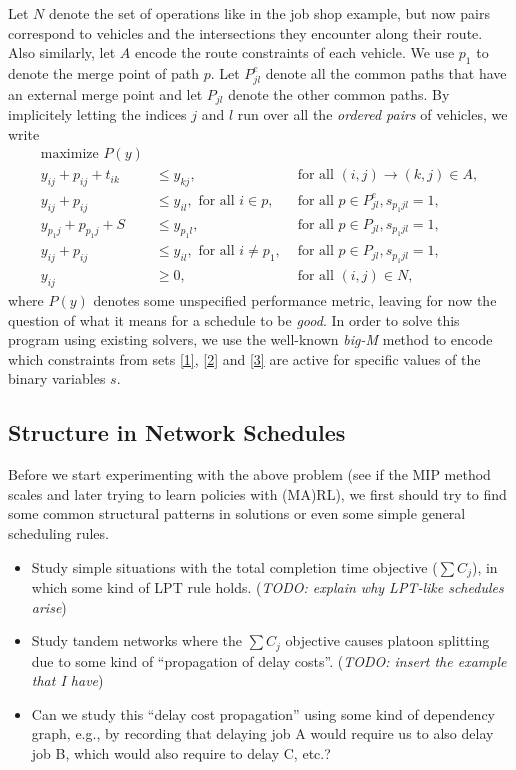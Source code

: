 \documentclass{article}
\theoremstyle{definition}
\begin{document}
Let $N$ denote the set of operations like in the job shop example, but now pairs
correspond to vehicles and the intersections they encounter along their route.
Also similarly, let $A$ encode the route constraints of each vehicle. We use
$p_{1}$ to denote the merge point of path $p$. Let $P_{jl}^{e}$ denote all the
common paths that have an external merge point and let $P_{jl}$ denote the other
common paths. By implicitely letting the indices $j$ and $l$ run over all the
\textit{ordered pairs} of vehicles, we write
%
\begin{subequations}
\begin{align}
  \text{maximize } P(y) \\
  y_{ij} + p_{ij} + t_{ik} &\leq y_{kj}, & \text{ for all } (i,j) \xrightarrow{} (k,j) \in A, \\
  \label{1} y_{ij} + p_{ij} &\leq y_{il}, \text{ for all } i \in p, &\text{ for all } p \in P_{jl}^{e}, s_{p_{1}jl} = 1, \\
  \label{2} y_{p_{1}j} + p_{p_{1}j} + S &\leq y_{p_{1}l},  &\text{ for all } p \in P_{jl}, s_{p_{1}jl} = 1, \\
  \label{3} y_{ij} + p_{ij} &\leq y_{il}, \text{ for all } i \neq p_{1}, &\text{ for all } p \in P_{jl}, s_{p_{1}jl} = 1, \\
  y_{ij} &\geq 0, & \text{ for all } (i,j) \in N ,
\end{align}
\end{subequations}
where $P(y)$ denotes some unspecified performance metric, leaving for now the
question of what it means for a schedule to be \textit{good}.
In order to solve this program using existing solvers, we use the well-known
\textit{big-M} method to encode which constraints from sets \eqref{1}, \eqref{2}
and \eqref{3} are active for specific values of the binary variables $s$.


\subsection{Structure in Network Schedules}

Before we start experimenting with the above problem (see if the MIP method
scales and later trying to learn policies with (MA)RL), we first should try to
find some common structural patterns in solutions or even some simple general
scheduling rules.

\begin{itemize}
  \item Study simple situations with the total completion time objective ($\sum C_{j}$), in which some kind of LPT rule holds. (\textit{TODO: explain why LPT-like schedules arise})
  \item Study tandem networks where the $\sum C_{j}$ objective causes platoon splitting due to some kind of ``propagation of delay costs''. (\textit{TODO: insert the example that I have})
  \item Can we study this ``delay cost propagation'' using some kind of dependency graph, e.g., by recording that delaying job A would require us to also delay job B, which would also require to delay C, etc.?
\end{itemize}
\end{document}
